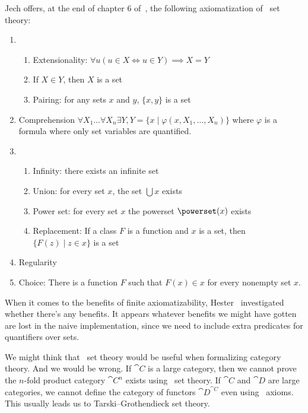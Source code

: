 \begin{node}\label{nbg-000D}%
Jech offers, at the end of chapter 6 of~\cite{jech2003set},
the following axiomatization of \NBG\ set theory:
\begin{enumerate}
  \item \begin{enumerate}
  \item Extensionality: $\forall u(u\in X\iff u\in Y)\implies X=Y$
  \item If $X\in Y$, then $X$ is a set
  \item Pairing: for any sets $x$ and $y$, $\{x,y\}$ is a set
  \end{enumerate}
  \item Comprehension $\forall X_{1}\dots\forall X_{n}\exists Y, Y=\{x\mid\varphi(x,X_{1},\dots,X_{n})\}$
    where $\varphi$ is a formula where only set variables are quantified.
  \item \begin{enumerate}
  \item Infinity: there exists an infinite set
  \item Union: for every set $x$, the set $\bigcup x$ exists
  \item Power set: for every set $x$ the powerset $\powerset(x)$ exists
  \item Replacement: If a class $F$ is a function and $x$ is a set, then
    $\{F(z)\mid z\in x\}$ is a set
  \end{enumerate}
  \item Regularity
  \item Choice: There is a function $F$ such that $F(x)\in x$ for every
    nonempty set $x$.
\end{enumerate}
\end{node}

\begin{node}\label{nbg-000E}%
When it comes to the benefits of finite axiomatizability,
Hester~\cite{hester2019automated} investigated whether there's any
benefits. It appears whatever benefits we might have gotten are lost in
the naive implementation, since we need to include extra predicates for
quantifiers over sets.
\end{node}

\begin{node}\label{nbg-000P}%
We might think that \NBG\ set theory would be useful when formalizing
category theory. And we would be wrong. If $\cat{C}$ is a large
category, then we cannot prove the $n$-fold product category
$\cat{C}^{n}$ exists using \NBG\ set theory. If $\cat{C}$ and $\cat{D}$
are large categories, we cannot define the category of functors
$\cat{D}^{\cat{C}}$ even using \MK\ axioms. This usually leads us to
Tarski--Grothendieck set theory.
\end{node}
